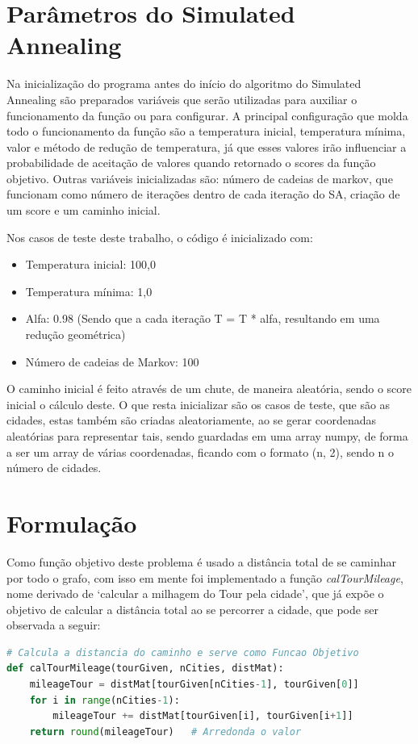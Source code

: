 \documentclass{article}
\begin{document}
\section{Parâmetros do Simulated Annealing}
Na inicialização do programa antes do início do algoritmo do Simulated Annealing são preparados variáveis que serão utilizadas para auxiliar o funcionamento da função ou para configurar. A principal configuração que molda todo o funcionamento da função são a temperatura inicial, temperatura mínima, valor e método de redução de temperatura, já que esses valores irão influenciar a probabilidade de aceitação de valores quando retornado o scores da função objetivo. Outras variáveis inicializadas são: número de cadeias de markov, que funcionam como número de iterações dentro de cada iteração do SA, criação de um score e um caminho inicial.

Nos casos de teste deste trabalho, o código é inicializado com:
\begin{itemize}
    \item Temperatura inicial: 100,0
    \item Temperatura mínima: 1,0
    \item Alfa: 0.98 (Sendo que a cada iteração T = T * alfa, resultando em uma redução geométrica)
    \item Número de cadeias de Markov: 100
\end{itemize}

O caminho inicial é feito através de um chute, de maneira aleatória, sendo o score inicial o cálculo deste. O que resta inicializar são os casos de teste, que são as cidades, estas também são criadas aleatoriamente, ao se gerar coordenadas aleatórias para representar tais, sendo guardadas em uma array numpy, de forma a ser um array de várias coordenadas, ficando com o formato (n, 2), sendo n o número de cidades.

\section{Formulação}
Como função objetivo deste problema é usado a distância total de se caminhar por todo o grafo, com isso em mente foi implementado a função \textit{calTourMileage}, nome derivado de ‘calcular a milhagem do Tour pela cidade’, que já expõe o objetivo de calcular a distância total ao se percorrer a cidade, que pode ser observada a seguir:

\begin{lstlisting}[language=Python, caption={Função Objetivo, cálculo distância do caminho.}]
# Calcula a distancia do caminho e serve como Funcao Objetivo
def calTourMileage(tourGiven, nCities, distMat):
    mileageTour = distMat[tourGiven[nCities-1], tourGiven[0]]   
    for i in range(nCities-1):                                  
        mileageTour += distMat[tourGiven[i], tourGiven[i+1]]
    return round(mileageTour)   # Arredonda o valor
\end{lstlisting}
\end{document}
